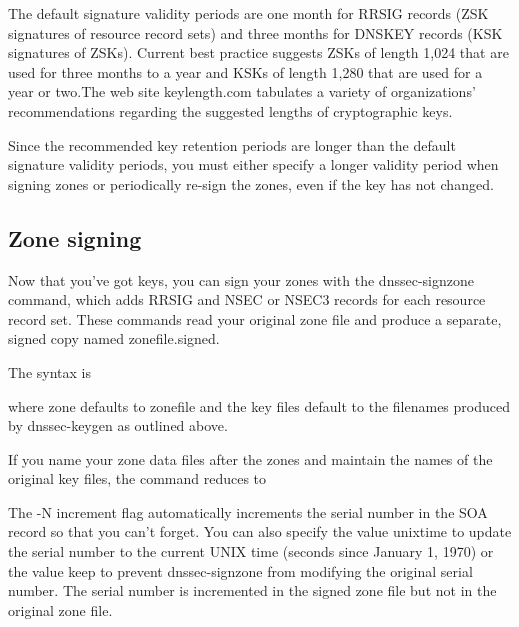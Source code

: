 The default signature validity periods are one month for RRSIG records
(ZSK signatures of resource record sets) and three months for DNSKEY
records (KSK signatures of ZSKs). Current best practice suggests ZSKs of
length 1,024 that are used for three months to a year and KSKs of length
1,280 that are used for a year or two.The web site keylength.com
tabulates a variety of organizations' recommendations regarding the
suggested lengths of cryptographic keys.

Since the recommended key retention periods are longer than the default
signature validity periods, you must either specify a longer validity
period when signing zones or periodically re-sign the zones, even if the
key has not changed.

\protect\hypertarget{part0024_split_064.html}{}{}

\hypertarget{part0024_split_064.htmlux5cux23_idContainer1069}{}
\hypertarget{part0024_split_064.htmlux5cux23calibre_pb_63}{%
\subsection[Zone
signing]{\texorpdfstring{\protect\hypertarget{part0024_split_064.htmlux5cux23_idTextAnchor943}{}{}Zone
signing}{Zone signing}}\label{part0024_split_064.htmlux5cux23calibre_pb_63}}

\protect\hypertarget{part0024_split_064.htmlux5cux23_idIndexMarker2264}{}{}\protect\hypertarget{part0024_split_064.htmlux5cux23_idIndexMarker2265}{}{}Now
that you've got keys, you can sign your zones with the {dnssec-signzone}
command, which adds RRSIG and NSEC or NSEC3 records for each resource
record set. These commands read your original zone file and produce a
separate, signed copy named {zonefile}{.signed}.

The syntax
is\protect\hypertarget{part0024_split_064.htmlux5cux23_idIndexMarker2266}{}{}\protect\hypertarget{part0024_split_064.htmlux5cux23_idIndexMarker2267}{}{}


where {zone} defaults to {zonefile} and the key files default to the
filenames produced by {dnssec-keygen} as outlined above.

If you name your zone data files after the zones and maintain the names
of the original key files, the command reduces to


The {-N increment }flag automatically increments the serial number in
the SOA record so that you can't forget. You can also specify the value
{unixtime} to update the serial number to the current UNIX time (seconds
since January 1, 1970) or the value {keep} to prevent {dnssec-signzone}
from modifying the original serial number. The serial number is
incremented in the signed zone file but not in the original zone file.

